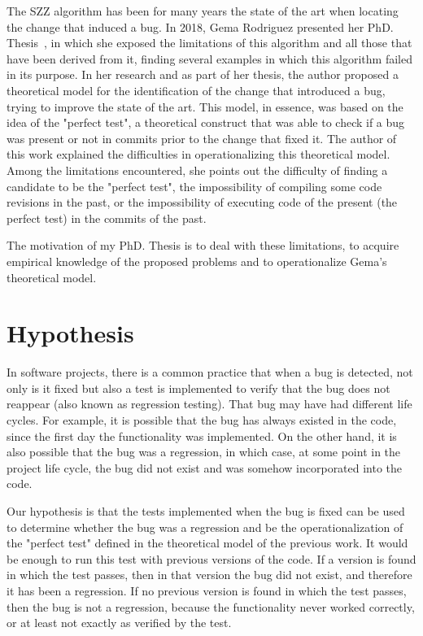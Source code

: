 The SZZ algorithm has been for many years the state of the art when locating the change that induced a bug. 
In 2018, Gema Rodriguez presented her PhD. Thesis~\cite{rodriguez2018towards}, in which she exposed the limitations of this algorithm and all those that have been derived from it, finding several examples in which this algorithm failed in its purpose. 
In her research and as part of her thesis, the author proposed a theoretical model for the identification of the change that introduced a bug, trying to improve the state of the art. 
This model, in essence, was based on the idea of the "perfect test", a theoretical construct that was able to check if a bug was present or not in commits prior to the change that fixed it. The author of this work explained the difficulties in operationalizing this theoretical model. 
Among the limitations encountered, she points out the difficulty of finding a candidate to be the "perfect test", the impossibility of compiling some code revisions in the past, or the impossibility of executing code of the present (the perfect test) in the commits of the past.

The motivation of my PhD. Thesis is to deal with these limitations, to acquire empirical knowledge of the proposed problems and to operationalize Gema's theoretical model.

\section{Hypothesis}

In software projects, there is a common practice that when a bug is detected, not only is it fixed but also a test is implemented to verify that the bug does not reappear (also known as regression testing). 
That bug may have had different life cycles. 
For example, it is possible that the bug has always existed in the code, since the first day the functionality was implemented. 
On the other hand, it is also possible that the bug was a regression, in which case, at some point in the project life cycle, the bug did not exist and was somehow incorporated into the code. 

Our hypothesis is that the tests implemented when the bug is fixed can be used to determine whether the bug was a regression and be the operationalization of the "perfect test" defined in the theoretical model of the previous work. 
It would be enough to run this test with previous versions of the code. 
If a version is found in which the test passes, then in that version the bug did not exist, and therefore it has been a regression. 
If no previous version is found in which the test passes, then the bug is not a regression, because the functionality never worked correctly, or at least not exactly as verified by the test.

